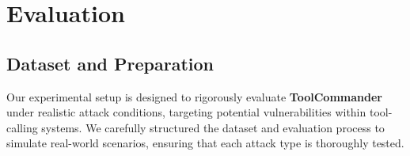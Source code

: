 \begin{table*}[htb]
\centering
{}
\caption{\label{ASR-toolcommander-Stage 2}
The ASR of Stage 2 across all keywords and settings on the training set with stolen queries. We omitted the UTC results for Contriever because no relevant samples were available, i.e. all queries in the training set with queries failed to retrieve our target tool.
}
\end{table*}

\section{Evaluation}
\label{sec:evaluation}
\subsection{Dataset and Preparation}
Our experimental setup is designed to rigorously evaluate \textbf{ToolCommander} under realistic attack conditions, targeting potential vulnerabilities within tool-calling systems. We carefully structured the dataset and evaluation process to simulate real-world scenarios, ensuring that each attack type is thoroughly tested.

